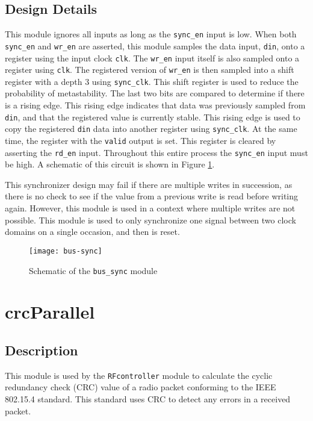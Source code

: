 \subsection{Design Details}
This module ignores all inputs as long as the \texttt{sync\_en} input is low. When both \texttt{sync\_en} and \texttt{wr\_en} are asserted, this module samples the data input, \texttt{din}, onto a register using the input clock \texttt{clk}. The \texttt{wr\_en} input itself is also sampled onto a register using \texttt{clk}. The registered version of \texttt{wr\_en} is then sampled into a shift register with a depth 3 using \texttt{sync\_clk}. This shift register is used to reduce the probability of metastability. The last two bits are compared to determine if there is a rising edge. This rising edge indicates that data was previously sampled from \texttt{din}, and that the registered value is currently stable. This rising edge is used to copy the registered \texttt{din} data into another register using \texttt{sync\_clk}. At the same time, the register with the \texttt{valid} output is set. This register is cleared by asserting the \texttt{rd\_en} input. Throughout this entire process the \texttt{sync\_en} input must be high. A schematic of this circuit is shown in Figure \ref{fig:bus-sync}.

This synchronizer design may fail if there are multiple writes in succession, as there is no check to see if the value from a previous write is read before writing again. However, this module is used in a context where multiple writes are not possible. This module is used to only synchronize one signal between two clock domains on a single occasion, and then is reset.

\begin{figure}
\centering
\texttt{[image: bus-sync]}
\caption{Schematic of the \texttt{bus\_sync} module}
\label{fig:bus-sync}
\end{figure}

\section{crcParallel}
\subsection{Description}
This module is used by the \texttt{RFcontroller} module to calculate the cyclic redundancy check (CRC) value of a radio packet conforming to the IEEE 802.15.4 standard. This standard uses CRC to detect any errors in a received packet.


